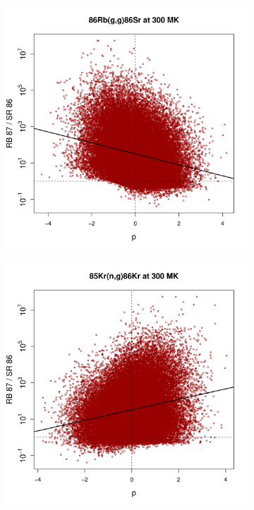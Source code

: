 \begin{figure}[t]
\begin{subfigure}[b]{0.495\textwidth}
\includegraphics[width=\textwidth]{Chapter-3/figs/CorrRB87SR86_86Rb_g_g_86Sr_300MK.png}
\end{subfigure}
\begin{subfigure}[b]{0.495\textwidth}   
\centering 
\includegraphics[width=\textwidth]{Chapter-3/figs/CorrRB87SR86_85Kr_n_g_86Kr_300MK.png}

\end{subfigure}
\end{figure}
